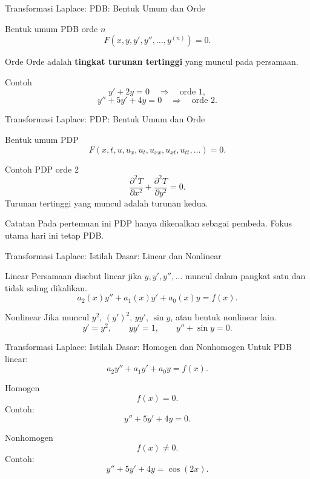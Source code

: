 \documentclass[aspectratio=169,11pt]{beamer}
\begin{document}
\begin{frame}{Transformasi Laplace: PDB: Bentuk Umum dan Orde}
\begin{block}{Bentuk umum PDB orde $n$}
\[
F\left(x,y,y',y'',\ldots,y^{(n)}\right)=0.
\]
\end{block}
\begin{block}{Orde}
Orde adalah \textbf{tingkat turunan tertinggi} yang muncul pada persamaan.
\end{block}
\begin{exampleblock}{Contoh}
\[
y' + 2y = 0 \quad \Rightarrow \quad \text{orde 1},
\]
\[
y''+5y'+4y=0 \quad \Rightarrow \quad \text{orde 2}.
\]
\end{exampleblock}
\end{frame}

\begin{frame}{Transformasi Laplace: PDP: Bentuk Umum dan Orde}
\begin{block}{Bentuk umum PDP}
\[
F\left(x,t,u,u_x,u_t,u_{xx},u_{xt},u_{tt},\ldots\right)=0.
\]
\end{block}
\begin{exampleblock}{Contoh PDP orde 2}
\[
\frac{\partial^2 T}{\partial x^2}+\frac{\partial^2 T}{\partial y^2}=0.
\]
Turunan tertinggi yang muncul adalah turunan kedua.
\end{exampleblock}
\begin{alertblock}{Catatan}
Pada pertemuan ini PDP hanya dikenalkan sebagai pembeda. Fokus utama hari ini tetap PDB.
\end{alertblock}
\end{frame}

\begin{frame}{Transformasi Laplace: Istilah Dasar: Linear dan Nonlinear}
\begin{block}{Linear}
Persamaan disebut linear jika $y,y',y'',\ldots$ muncul dalam pangkat satu dan tidak saling dikalikan.
\[
a_2(x)y''+a_1(x)y'+a_0(x)y=f(x).
\]
\end{block}
\begin{block}{Nonlinear}
Jika muncul $y^2$, $(y')^2$, $yy'$, $\sin y$, atau bentuk nonlinear lain.
\[
y'=y^2,\qquad yy'=1,\qquad y''+\sin y=0.
\]
\end{block}
\end{frame}

\begin{frame}{Transformasi Laplace: Istilah Dasar: Homogen dan Nonhomogen}
Untuk PDB linear:
\[
a_2y''+a_1y'+a_0y=f(x).
\]
\begin{block}{Homogen}
\[
f(x)=0.
\]
Contoh:
\[
y''+5y'+4y=0.
\]
\end{block}
\begin{block}{Nonhomogen}
\[
f(x)\ne 0.
\]
Contoh:
\[
y''+5y'+4y=\cos(2x).
\]
\end{block}
\end{frame}
\end{document}
